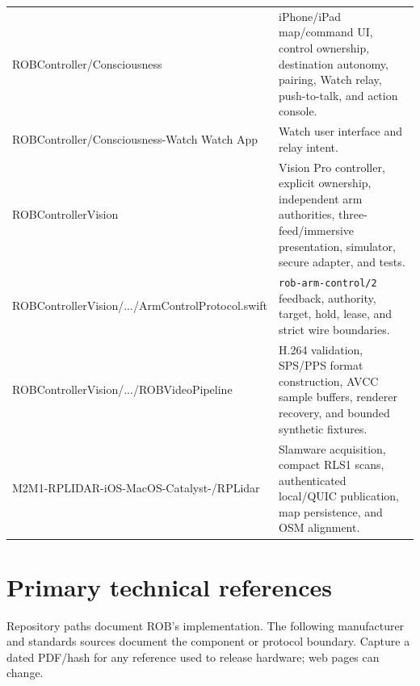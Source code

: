 \documentclass[10pt,openany]{book}
\begin{document}
\begin{tabularx}{\textwidth}{>{\ttfamily\scriptsize}p{2.65in} X}
ROBController/Consciousness & iPhone/iPad map/command UI, control ownership, destination autonomy, pairing, Watch relay, push-to-talk, and action console.\\
ROBController/Consciousness-Watch Watch App & Watch user interface and relay intent.\\
ROBControllerVision & Vision Pro controller, explicit ownership, independent arm authorities, three-feed/immersive presentation, simulator, secure adapter, and tests.\\
ROBControllerVision/.../ArmControlProtocol.swift & \texttt{rob-arm-control/2} feedback, authority, target, hold, lease, and strict wire boundaries.\\
ROBControllerVision/.../ROBVideoPipeline & H.264 validation, SPS/PPS format construction, AVCC sample buffers, renderer recovery, and bounded synthetic fixtures.\\
M2M1-RPLIDAR-iOS-MacOS-Catalyst-/RPLidar & Slamware acquisition, compact RLS1 scans, authenticated local/QUIC publication, map persistence, and OSM alignment.\\
\bottomrule
\end{tabularx}

\chapter{Primary technical references}

Repository paths document ROB's implementation. The following manufacturer and standards sources document the component or protocol boundary. Capture a dated PDF/hash for any reference used to release hardware; web pages can change.
\end{document}
